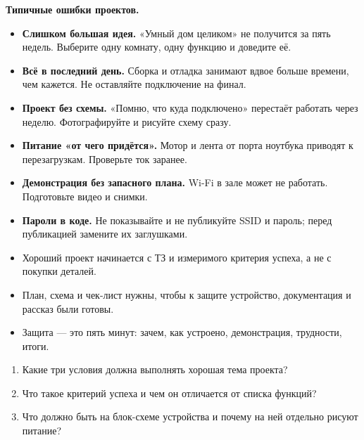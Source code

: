 \begin{caution}
\textbf{Типичные ошибки проектов.}
\begin{itemize}[leftmargin=*]
  \item \textbf{Слишком большая идея.} «Умный дом целиком» не получится за пять недель. Выберите одну комнату, одну функцию и доведите её.
  \item \textbf{Всё в последний день.} Сборка и отладка занимают вдвое больше времени, чем кажется. Не оставляйте подключение на финал.
  \item \textbf{Проект без схемы.} «Помню, что куда подключено» перестаёт работать через неделю. Фотографируйте и рисуйте схему сразу.
  \item \textbf{Питание «от чего придётся».} Мотор и лента от порта ноутбука приводят к перезагрузкам. Проверьте ток заранее.
  \item \textbf{Демонстрация без запасного плана.} Wi-Fi в зале может не работать. Подготовьте видео и снимки.
  \item \textbf{Пароли в коде.} Не показывайте и не публикуйте SSID и пароль; перед публикацией замените их заглушками.
\end{itemize}
\end{caution}

\begin{summary}
\begin{itemize}[leftmargin=*]
  \item Хороший проект начинается с ТЗ и измеримого критерия успеха, а не с покупки деталей.
  \item План, схема и чек-лист нужны, чтобы к защите устройство, документация и рассказ были готовы.
  \item Защита --- это пять минут: зачем, как устроено, демонстрация, трудности, итоги.
\end{itemize}
\end{summary}

\begin{selfcheck}
\begin{enumerate}
  \item Какие три условия должна выполнять хорошая тема проекта?
  \item Что такое критерий успеха и чем он отличается от списка функций?
  \item Что должно быть на блок-схеме устройства и почему на ней отдельно рисуют питание?
\end{enumerate}
\end{selfcheck}

